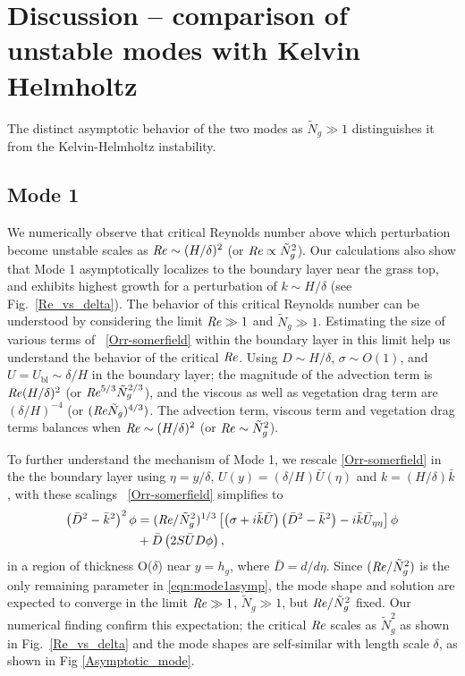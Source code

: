 \documentclass{jfm}
\newcommand{\hg}{h_g}
\newcommand{\Ndg}{\tilde{N}_g}
\newcommand{\ubl}{U_\text{bl}}
\begin{document}
\section{Discussion -- comparison of unstable modes with Kelvin Helmholtz}
The distinct asymptotic behavior of the two modes as $\Ndg \gg 1$ distinguishes it from the Kelvin-Helmholtz instability. 
\subsection{Mode 1}
We numerically observe that critical Reynolds number above which perturbation become unstable scales as  $\mbox{\textit{Re}} \sim (H/\delta)^2$ (or $\Rey \propto {\Ndg}^{2}$). 
Our calculations also show that Mode 1 asymptotically localizes to the boundary layer near the grass top, and exhibits highest growth for a perturbation of  $k \sim H/\delta$ (see Fig.~\ref{Re_vs_delta}). 
The behavior of this critical Reynolds number can be understood by considering the limit $\mbox{\textit{Re}} \gg 1$ and $\Ndg \gg 1$.
Estimating the size of various terms of ~\eqref{Orr-somerfield} within the boundary layer in this limit help us understand the behavior of the critical $\mbox{\textit{Re}}$. 
Using $D\sim H/\delta$, $\sigma \sim O(1)$, and $U=\ubl \sim \delta/H$ in the boundary layer; the magnitude of the advection term is $\mbox{\textit{Re}} (H/\delta)^2$  (or $\Rey^{5/3} \Ndg^{2/3}$), and the viscous as well as vegetation drag term are $(\delta/H)^{-4}$ (or $(\Rey \Ndg)^{4/3})$. 
The advection term, viscous term and vegetation drag terms balances when $\mbox{\textit{Re}} \sim (H/\delta)^2$ (or $\Rey \sim {\Ndg}^{2}$).

To further understand the mechanism of Mode 1, we rescale \eqref{Orr-somerfield} in the the boundary layer using $\eta = y/\delta$, 
$U(y) = (\delta/H)\bar{U}(\eta)$ and $k = (H/\delta) \bar{k}$, with these scalings ~\eqref{Orr-somerfield} simplifies to
\begin{equation}
\begin{split}
\left(\bar{D}^2 -\bar{k}^{2} \right)^2\phi &= (\Rey/\Ndg^2)^{1/3} \left[ \left({\sigma}+i\bar{k}\bar{U}\right) \left(\bar{D}^2-\bar{k}^2\right) -i\bar{k}\bar{U}_{\eta\eta}\right]\phi \\
&+\bar{D}\left(2S \bar{U} D \phi\right),
\label{eqn:mode1asymp}
\end{split}
\end{equation}
in a region of thickness O($\delta$) near $y=\hg$, where $\bar{D} = d/d\eta$. 
Since $(\Rey/\Ndg^2)$ is the only remaining parameter in \eqref{eqn:mode1asymp}, the mode shape and solution are expected to converge in the limit $\mbox{\textit{Re}} \gg 1$, $\Ndg \gg 1$, but $\Rey/\Ndg^2$ fixed.
Our numerical finding confirm this expectation; the critical $\mbox{\textit{Re}}$ scales as $\Ndg^2$ as shown in Fig.~\ref{Re_vs_delta} and the mode shapes are self-similar with length scale $\delta$, as shown in Fig \ref{Asymptotic_mode}. 
\end{document}
